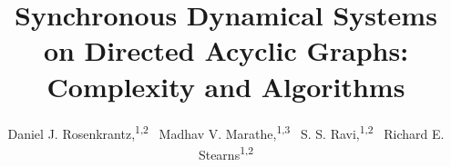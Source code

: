 \documentclass[letterpaper]{article} %
\title{Synchronous Dynamical Systems on Directed Acyclic Graphs:\newline
       Complexity and Algorithms
}
\author{
Daniel J. Rosenkrantz,\textsuperscript{\rm 1,2}~
Madhav V. Marathe,\textsuperscript{\rm 1,3}~
S. S. Ravi,\textsuperscript{\rm 1,2}~
Richard E. Stearns\textsuperscript{\rm 1,2} {\medskip}\\
}
\begin{document}

\newtheorem{theorem}{Theorem}[section]
\newtheorem{lemma}{Lemma}[section]
\newtheorem{corollary}{Corollary}[section]
\newtheorem{fact}{Fact}[section]
\newtheorem{definition}{Definition}[section]
\newtheorem{proposition}{Proposition}[section]
\newtheorem{observation}{Observation}[section]
\newtheorem{claim}{Claim}[section]

\newcommand{\true}{\texttt{True}}
\newcommand{\false}{\texttt{False}}

\newcommand{\QED}{\hfill\rule{2mm}{2mm}}

\newcommand{\irange}{\mbox{$1 \leq i \leq n$}}
\newcommand{\jrange}{\mbox{$1 \leq j \leq m$}}

\newcommand{\dunder}[1]{\underline{\underline{#1}}}

\newcommand{\bbb}{\mbox{$\mathbb{B}$}}

\newcommand{\cals}{\mbox{$\mathcal{S}$}}
\newcommand{\calc}{\mbox{$\mathcal{C}$}}
\newcommand{\cali}{\mbox{$\mathcal{I}$}}
\newcommand{\calcp}{\mbox{$\mathcal{C'}$}}
\newcommand{\cald}{\mbox{$\mathcal{D}$}}
\newcommand{\call}{\mbox{$\mathcal{L}$}}
\newcommand{\calf}{\mbox{$\mathcal{F}$}}

\newcommand{\calco}{\mbox{$\mathcal{C}_{1}$}}
\newcommand{\calcz}{\mbox{$\mathcal{C}_0$}}
\newcommand{\calci}{\mbox{$\mathcal{C}_i$}}
\newcommand{\calcipo}{\mbox{$\mathcal{C}_{i+1}$}}
\newcommand{\calct}{\mbox{$\mathcal{C}_{t}$}}
\newcommand{\calctmo}{\mbox{$\mathcal{C}_{t-1}$}}
\newcommand{\dcare}{\texttt{x}}

\newcommand{\genprob}{\mbox{\textsc{CSC}}}
\newcommand{\pre}{\textsc{Pre}}
\newcommand{\npre}{\textsc{\#Pre}}

\newcommand{\cnp}{\textsf{NP}}
\newcommand{\cconp}{\textsf{Co-NP}}
\newcommand{\cpsp}{\textsf{PSPACE}}

\newcommand{\ourop}{\mbox{$\otimes$}}

\maketitle

\begin{abstract}

\end{abstract}

\setcounter{footnote}{3}




\end{document}
